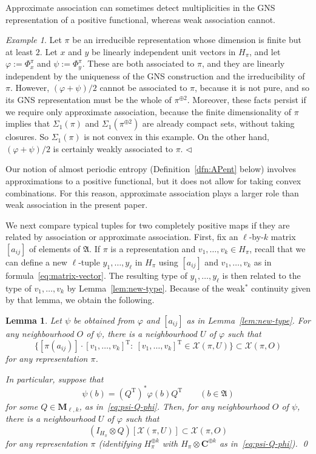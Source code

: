 \documentclass[12pt,a4paper]{article}
\numberwithin{equation}{section}
\newtheorem{lem}[thm]{Lemma}
\theoremstyle{remark}
\newtheorem{ex}[thm]{Example}
\renewcommand{\rm}[1]{\mathrm{#1}}
\newcommand{\bbC}{\mathbf{C}}
\newcommand{\rmM}{\mathbf{M}}
\newcommand{\X}{\mathcal{X}}
\newcommand{\A}{\mathfrak{A}}
\renewcommand{\S}{\Sigma}
\renewcommand{\phi}{\varphi}
\newcommand{\fin}{\nolinebreak\hspace{\stretch{1}}$\lhd$}
\begin{document}
Approximate association can sometimes detect multiplicities in the GNS representation of a positive functional, whereas weak association cannot.

\begin{ex}\label{ex:sigma-not-convex}
Let $\pi$ be an irreducible representation whose dimension is finite but at least $2$.  Let $x$ and $y$ be linearly independent unit vectors in $H_\pi$, and let $\phi:= \Phi^\pi_x$ and $\psi := \Phi^\pi_y$.  These are both associated to $\pi$, and they are linearly independent by the uniqueness of the GNS construction and the irreducibility of $\pi$.  However, $(\phi + \psi)/2$ cannot be associated to $\pi$, because it is not pure, and so its GNS representation must be the whole of $\pi^{\oplus 2}$.  Moreover, these facts persist if we require only approximate association, because the finite dimensionality of $\pi$ implies that $\S_1(\pi)$ and $\S_1(\pi^{\oplus 2})$ are already compact sets, without taking closures.  So $\S_1(\pi)$ is not convex in this example.  On the other hand, $(\phi + \psi)/2$ is certainly weakly associated to $\pi$. \fin
\end{ex}

Our notion of almost periodic entropy (Definition~\ref{dfn:APent} below) involves approximations to a positive functional, but it does not allow for taking convex combinations.  For this reason, approximate association plays a larger role than weak association in the present paper.

We next compare typical tuples for two completely positive maps if they are related by association or approximate association.  First, fix an $\ell$-by-$k$ matrix $[a_{ij}]$ of elements of $\A$.  If $\pi$ is a representation and ${v_1, \dots, v_k} \in H_\pi$, recall that we can define a new $\ell$-tuple ${y_1, \dots, y_\ell}$ in $H_\pi$ using $[a_{ij}]$ and ${v_1, \dots, v_k}$ as in formula~\eqref{eq:matrix-vector}.  The resulting type of ${y_1, \dots, y_\ell}$ is then related to the type of ${v_1, \dots, v_k}$ by Lemma~\ref{lem:new-type}.  Because of the weak$^\ast$ continuity given by that lemma, we obtain the following.

\begin{lem}\label{lem:lin-maps}
	Let $\psi$ be obtained from $\phi$ and $[a_{ij}]$ as in Lemma~\ref{lem:new-type}. For any neighbourhood $O$ of $\psi$, there is a neighbourhood $U$ of $\phi$ such that
\[\big\{[\pi(a_{ij})]\cdot[v_1,\dots,v_k]^\rm{T}:\ [v_1,\dots,v_k]^\rm{T} \in \X(\pi,U)\big\} \subset \X(\pi,O)\]
for any representation $\pi$.

In particular, suppose that
\[\psi(b) = (Q^\rm{T})^\ast \phi(b) Q^\rm{T} \qquad (b \in \A)\]
for some $Q \in \rmM_{\ell,k}$, as in~\eqref{eq:psi-Q-phi}.  Then, for any neighbourhood $O$ of $\psi$, there is a neighbourhood $U$ of $\phi$ such that
\[(I_{H_\pi}\otimes Q)[\X(\pi,U)] \subset \X(\pi,O)\]
for any representation $\pi$ (identifying $H_\pi^{\oplus k}$ with $H_\pi\otimes \bbC^{\oplus k}$ as in~\eqref{eq:psi-Q-phi}). \qed
\end{lem}
\end{document}
